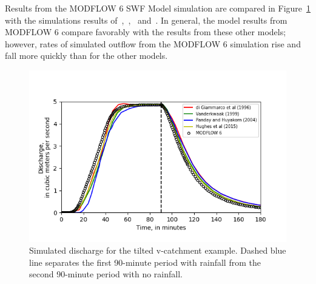 \documentclass[fleqn]{article}
\begin{document}
Results from the MODFLOW 6 SWF Model simulation are compared in Figure~\ref{fig:vcatch} with the simulations results of~\cite{digiammarco1996},~\cite{VanderKwaak1999},~\cite{panday2004} and~\cite{hughes2015}.  In general, the model results from MODFLOW 6 compare favorably with the results from these other models; however, rates of simulated outflow from the MODFLOW 6 simulation rise and fall more quickly than for the other models.

\begin{figure}
	\centering
	\includegraphics[scale=0.75]{figures/vcatch-results.png}
	\caption[Simulated discharge for the tilted v-catchment example.]{Simulated discharge for the tilted v-catchment example.  Dashed blue line separates the first 90-minute period with rainfall from the second 90-minute period with no rainfall.}
	\label{fig:vcatch}
\end{figure}


 
\end{document}
